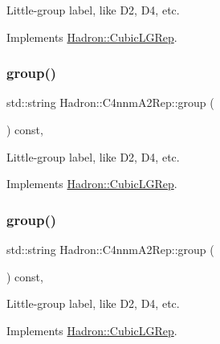 Little-\/group label, like D2, D4, etc. 

Implements \mbox{\hyperlink{structHadron_1_1CubicLGRep_a9bdb14b519a611d21379ed96a3a9eb41}{Hadron\+::\+Cubic\+L\+G\+Rep}}.

\mbox{\label{structHadron_1_1C4nnmA2Rep_ae6a2ff8ed8fcc3e34ed1e46e493195ed}} 
\subsubsection{\texorpdfstring{group()}{group()}\hspace{0.1cm}{\footnotesize\ttfamily [3/5]}}
{\footnotesize\ttfamily std\+::string Hadron\+::\+C4nnm\+A2\+Rep\+::group (\begin{DoxyParamCaption}{ }\end{DoxyParamCaption}) const\hspace{0.3cm}{\ttfamily [inline]}, {\ttfamily [virtual]}}

Little-\/group label, like D2, D4, etc. 

Implements \mbox{\hyperlink{structHadron_1_1CubicLGRep_a9bdb14b519a611d21379ed96a3a9eb41}{Hadron\+::\+Cubic\+L\+G\+Rep}}.

\mbox{\label{structHadron_1_1C4nnmA2Rep_ae6a2ff8ed8fcc3e34ed1e46e493195ed}} 
\subsubsection{\texorpdfstring{group()}{group()}\hspace{0.1cm}{\footnotesize\ttfamily [4/5]}}
{\footnotesize\ttfamily std\+::string Hadron\+::\+C4nnm\+A2\+Rep\+::group (\begin{DoxyParamCaption}{ }\end{DoxyParamCaption}) const\hspace{0.3cm}{\ttfamily [inline]}, {\ttfamily [virtual]}}

Little-\/group label, like D2, D4, etc. 

Implements \mbox{\hyperlink{structHadron_1_1CubicLGRep_a9bdb14b519a611d21379ed96a3a9eb41}{Hadron\+::\+Cubic\+L\+G\+Rep}}.

\mbox{\label{structHadron_1_1C4nnmA2Rep_ae6a2ff8ed8fcc3e34ed1e46e493195ed}} 

